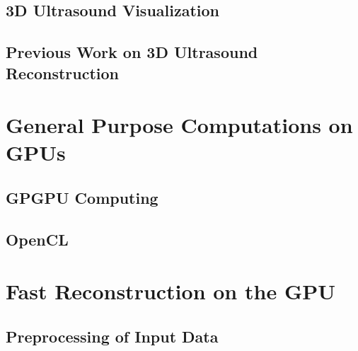 \documentclass[12pt, twoside, a4paper]{book}
\begin{document}
		
		
	\section{3D Ultrasound Visualization}
		\label{section:ultrasound_visualization}
	
		
		
	\section{Previous Work on 3D Ultrasound Reconstruction}

		
		
\chapter{General Purpose Computations on GPUs}
	\label{chapter:gpgpu}

	
	
	\section{GPGPU Computing}
	
		

	\section{OpenCL}
	
		

\chapter{Fast Reconstruction on the GPU}
	\label{chapter:gpu_reconstruction}
	
	
	
	\section{Preprocessing of Input Data}
	
		
	
\end{document}
